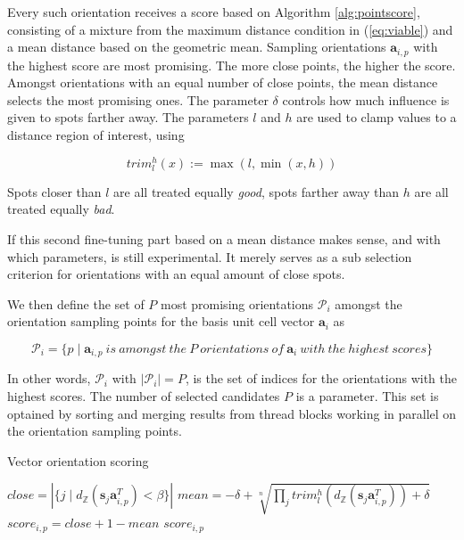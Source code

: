 \documentclass[a4paper,10pt]{article}
\newcommand{\vect}[1]{\mathbf{#1}}
\newcommand{\mat}[1]{\mathbf{#1}}
\newcommand{\distZ}[1]{d_\mathbb{Z}(#1)}
\newcommand{\trim}[3]{trim_{#1}^{#2}\left ( #3 \right )}
\begin{document}
Every such orientation receives a score based on Algorithm \ref{alg:pointscore}, consisting of a mixture from the maximum distance condition in (\ref{eq:viable}) and a mean distance based on the geometric mean. Sampling orientations $\vect{a}_{i,p}$ with the highest score are most promising. The more close points, the higher the score. Amongst orientations with an equal number of close points, the mean distance selects the most promising ones. The parameter $\delta$ controls how much influence is given to spots farther away. The parameters $l$ and $h$ are used to clamp values to a distance region of interest, using

\[
  \trim{l}{h}{x} := \max(l, \min(x, h))
\]

Spots closer than $l$ are all treated equally \emph{good}, spots farther away than $h$ are all treated equally \emph{bad}.

If this second fine-tuning part based on a mean distance makes sense, and with which parameters, is still experimental. It merely serves as a sub selection criterion for orientations with an equal amount of close spots.

We then define the set of $P$ most promising orientations $\mathcal{P}_i$ amongst the orientation sampling points for the basis unit cell vector $\vect{a}_i$ as

\[
  \mathcal{P}_i = \{ p\mid \vect{a}_{i,p}\ is\ amongst\ the\ P\ orientations\ of\ \vect{a}_i\ with\ the\ highest\ scores \}
\]

In other words, $\mathcal{P}_i$ with $|\mathcal{P}_i|=P$, is the set of indices for the orientations with the highest scores. The number of selected candidates $P$ is a parameter. This set is optained by sorting and merging results from thread blocks working in parallel on the orientation sampling points.

\begin{algorithm}
\caption{Vector orientation scoring}
\label{alg:pointscore}
\begin{algorithmic}[1]
\Function{point-score}{$\vect{a}_{i,p},\mat{S}, \beta, l, h, \delta$}\Comment{$\mat{S} = \in \mathbb{R}^{n\times 3}, \mat{S}=\begin{pmatrix} \vect{s}_1\\ \vdots \\ \vect{s}_n \end{pmatrix}$}
\State $close = \left |\{j\mid \distZ{\vect{s}_j \vect{a}_{i,p}^T} < \beta \} \right |$
\State $mean = -\delta + \sqrt[n]{\prod_j \trim{l}{h}{\distZ{\vect{s}_j \vect{a}_{i,p}^T}} + \delta}$
\State $score_{i,p} = close+1-mean$
\State \Return $score_{i,p}$
\EndFunction
\end{algorithmic}
\end{algorithm}
\end{document}
